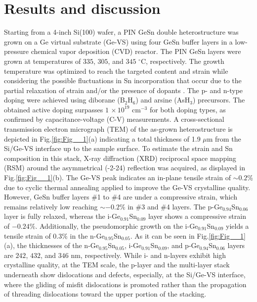 \section{Results and discussion}

\label{sec:Results}
\indent Starting from a 4-inch Si(100) wafer, a PIN GeSn double heterostructure was grown on a
Ge virtual substrate (Ge-VS) using four GeSn buffer layers in a low-pressure chemical vapor deposition (CVD) reactor. The PIN GeSn layers were grown at temperatures of $335$, $305$, and $345$ $^\circ$C, respectively. The growth temperature was optimized to reach the targeted content and strain while considering the possible fluctuations in Sn incorporation that occur due to the partial relaxation of strain and/or the presence of dopants \cite{assali2019,atalla2022}. The p- and n-type doping were achieved using diborane (B$_{2}$H$_{6}$) and arsine (AsH$_{3}$) precursors. The obtained active doping surpasses $1$ $\times \, 10^{19}$ cm$^{-3}$ for both doping types, as confirmed by capacitance-voltage (C-V) measurements. A cross-sectional transmission electron micrograph (TEM) of the as-grown heterostructure is depicted in Fig.\ref{fig:Fig__1}(a) indicating a total thickness of 1.9 $\mu$m from the Si/Ge-VS interface up to the sample surface. To estimate the strain and Sn composition in this stack, X-ray diffraction (XRD) reciprocal space mapping (RSM) around the asymmetrical (-2-24) reflection was acquired, as displayed in Fig.\ref{fig:Fig__1}(b). The Ge-VS peak indicates an in-plane tensile strain of $\sim 0.2$\%  due to cyclic thermal annealing applied to improve the Ge-VS crystalline quality. However, GeSn buffer layers \#1 to \#4 are under a compressive strain, which remains relatively low reaching $\sim -0.2$\% in \#3 and \#4 layers. The p-Ge$_{0.94}$Sn$_{0.06}$ layer is fully relaxed, whereas the i-Ge$_{0.91}$Sn$_{0.09}$ layer shows a compressive strain of  $-0.24 \%$. Additionally, the pseudomorphic growth on the i-Ge$_{0.91}$Sn$_{0.09}$ yields a tensile strain of $0.3 \%$ in the n-Ge$_{0.95}$Sn$_{0.05}$.  As it can be seen in Fig.\ref{fig:Fig__1}(a), the thicknesses of the n-Ge$_{0.95}$Sn$_{0.05}$, i-Ge$_{0.91}$Sn$_{0.09}$, and p-Ge$_{0.94}$Sn$_{0.06}$ layers are $242$, $432$, and $346$ nm, respectively. While i- and n-layers exhibit high crystalline quality, at the TEM scale, the p-layer and the multi-layer stack underneath show dislocations and defects, especially, at the Si/Ge-VS interface, where the gliding of misfit dislocations is promoted rather than the propagation of threading dislocations toward the upper portion of the stacking.


